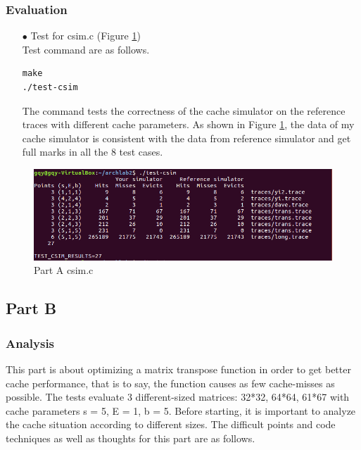 \documentclass{article}
\begin{document}
\subsubsection{Evaluation}

\begin{itemize}
\item[$\bullet$]Test for {\ttfamily csim.c} (Figure \ref{Part A: csim.c})\\
Test command are as follows.
\begin{lstlisting}[language={[ANSI]C}]
make
./test-csim
\end{lstlisting}
The command tests the correctness of the cache simulator on the reference traces with different cache parameters. As shown in Figure \ref{Part A: csim.c}, the data of my cache simulator is consistent with the data from reference simulator and get full marks in all the 8 test cases.
\end{itemize}
\begin{figure}[htbp]
		\centering
		\includegraphics{A}
		\caption{Part A  {\ttfamily csim.c}} \label{Part A: csim.c}
\end{figure}

\subsection{Part B}

\subsubsection{Analysis}

This part is about optimizing a matrix transpose function in order to get better cache performance, that is to say, the function causes as few cache-misses as possible. The tests evaluate 3 different-sized matrices: 32*32, 64*64, 61*67 with cache parameters s = 5, E = 1, b = 5. Before starting, it is important to analyze the cache situation according to different sizes. The difficult points and code techniques as well as thoughts for this part are as follows.\\
\end{document}
